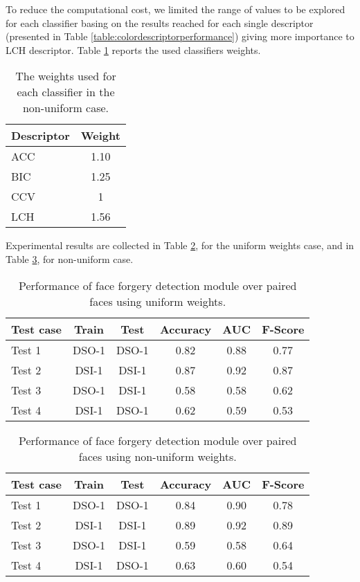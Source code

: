 To reduce the computational cost, we limited the range of values to be explored for each classifier basing on the results reached for each single descriptor (presented in Table \ref{table:colordescriptorperformance}) giving more importance to LCH descriptor. Table \ref{table:classifiersweights} reports the used classifiers weights.

\begin{table}[h!]
\centering
\begin{tabular}{l c} 
\hline \hline 
\textbf{Descriptor} & \textbf{Weight}\\ [0.5ex]
\hline
ACC & 1.10\\
BIC & 1.25\\
CCV & 1\\
LCH & 1.56\\ [1ex]
\hline
\end{tabular}
\caption{The weights used for each classifier in the non-uniform case.}
\label{table:classifiersweights}
\end{table}

Experimental results are collected in Table \ref{table:performancefacedet}, for the uniform weights case, and in Table \ref{table:performancefacedetnonun}, for non-uniform case. 

\begin{table}[h!]
\centering
\begin{tabular}{l c c c c c} 
\hline \hline 
\textbf{Test case} & \textbf{Train} & \textbf{Test} & \textbf{Accuracy} & \textbf{AUC} &\textbf{ F-Score} \\ [0.5ex]
\hline
Test 1 & DSO-1 & DSO-1 &	0.82 & 0.88	& 0.77\\
Test 2 & DSI-1 & DSI-1 &	0.87 & 0.92 & 0.87\\
Test 3 &	DSO-1 &	DSI-1 &	0.58 & 0.58 & 0.62\\
Test 4 &	DSI-1 & DSO-1 & 0.62 & 0.59 & 0.53\\ [1ex]
\hline
\end{tabular}
\caption{Performance of face forgery detection module over paired faces using uniform weights.}
\label{table:performancefacedet}
\end{table}

\begin{table}[h!]
\centering
\begin{tabular}{l c c c c c} 
\hline \hline 
\textbf{Test case} & \textbf{Train} & \textbf{Test} & \textbf{Accuracy} & \textbf{AUC} &\textbf{ F-Score} \\ [0.5ex]
\hline
Test 1 & DSO-1 & DSO-1 &	0.84 & 0.90	& 0.78\\
Test 2 & DSI-1 & DSI-1 &	0.89 & 0.92 & 0.89\\
Test 3 &	DSO-1 &	DSI-1 &	0.59 & 0.58 & 0.64\\
Test 4 &	DSI-1 & DSO-1 & 0.63 & 0.60 & 0.54\\ [1ex]
\hline
\end{tabular}
\caption{Performance of face forgery detection module over paired faces using non-uniform weights.}
\label{table:performancefacedetnonun}
\end{table}

